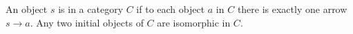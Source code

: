 An object $s$ is  in a category $C$ if to each object $a$ in $C$ there is exactly one arrow $s \rightarrow a$. Any two initial objects of $C$ are isomorphic in $C$.
